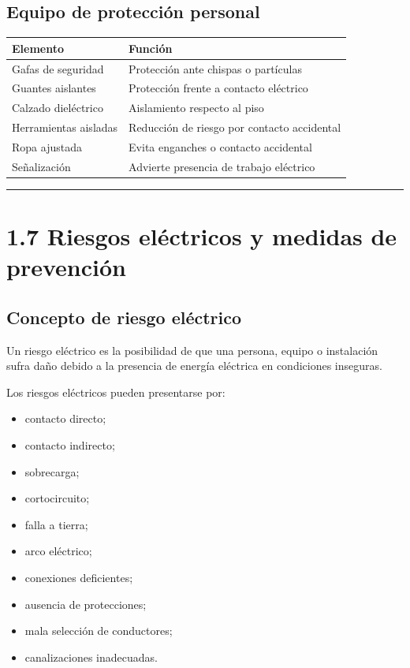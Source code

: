 \documentclass[
  spanish,
  letterpaper,
  DIV=11,
  numbers=noendperiod]{scrreprt}
\newcounter{none} %
\providecommand{\tightlist}{%
  \setlength{\itemsep}{0pt}\setlength{\parskip}{0pt}}
\begin{document}
\subsection{Equipo de protección
personal}\label{equipo-de-protecciuxf3n-personal}

{\def\LTcaptype{none} %
\begin{longtable}[]{@{}ll@{}}
\toprule\noalign{}
Elemento & Función \\
\midrule\noalign{}
\endhead
\bottomrule\noalign{}
\endlastfoot
Gafas de seguridad & Protección ante chispas o partículas \\
Guantes aislantes & Protección frente a contacto eléctrico \\
Calzado dieléctrico & Aislamiento respecto al piso \\
Herramientas aisladas & Reducción de riesgo por contacto accidental \\
Ropa ajustada & Evita enganches o contacto accidental \\
Señalización & Advierte presencia de trabajo eléctrico \\
\end{longtable}
}

\begin{center}\rule{0.5\linewidth}{0.5pt}\end{center}

\section{1.7 Riesgos eléctricos y medidas de
prevención}\label{riesgos-eluxe9ctricos-y-medidas-de-prevenciuxf3n}

\subsection{Concepto de riesgo
eléctrico}\label{concepto-de-riesgo-eluxe9ctrico}

Un riesgo eléctrico es la posibilidad de que una persona, equipo o
instalación sufra daño debido a la presencia de energía eléctrica en
condiciones inseguras.

Los riesgos eléctricos pueden presentarse por:

\begin{itemize}
\tightlist
\item
  contacto directo;
\item
  contacto indirecto;
\item
  sobrecarga;
\item
  cortocircuito;
\item
  falla a tierra;
\item
  arco eléctrico;
\item
  conexiones deficientes;
\item
  ausencia de protecciones;
\item
  mala selección de conductores;
\item
  canalizaciones inadecuadas.
\end{itemize}
\end{document}
